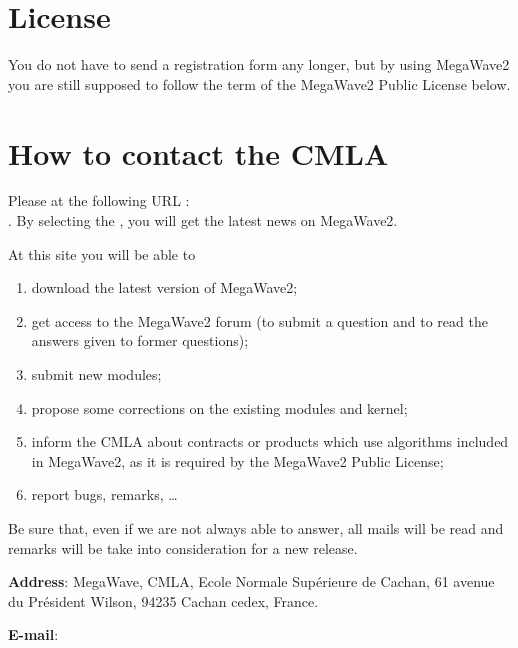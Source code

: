 %
%

\section{License}
\label{annex_license}

You do not have to send a registration form any longer, but by using MegaWave2 you are still
supposed to follow the term of the MegaWave2 Public License below.



\section{How to contact the CMLA}
\label{annex_contact}

Please 
at the following URL : \\
\httpcmla.
By selecting the 
, 
you will get the latest news
on MegaWave2.

At this site you will be able to
\begin{enumerate}
\item download the latest version of MegaWave2;
\item get access to the MegaWave2 forum 
(to submit a question and to read the answers given to former questions);
\item submit new modules;
\item propose some corrections on the existing modules and kernel;
\item inform the CMLA about contracts or products which use algorithms included in MegaWave2, as
it is required by the MegaWave2 Public License;
\item report bugs, remarks, \ldots
\end{enumerate}

Be sure that, even if we are not always able to answer, all mails will be read and remarks will 
be take into consideration for a new release.

{\bf Address}: MegaWave, CMLA, Ecole Normale Sup\'erieure de Cachan, 61 avenue du Pr\'esident Wilson,
               94235 Cachan cedex, France.

{\bf E-mail}: \emailmw{}





